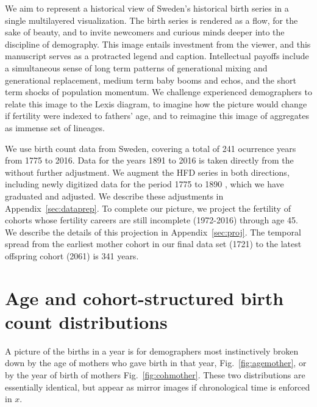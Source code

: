 \documentclass{article}
\begin{document}
We aim to represent a historical view of Sweden's historical birth series in a single multilayered visualization. The birth series is rendered as a flow, for the sake of beauty, and to invite newcomers and curious minds deeper into the discipline of demography. This image entails investment from the viewer, and this manuscript serves as a protracted legend and caption. Intellectual payoffs include a simultaneous sense of long term patterns of generational mixing and generational replacement, medium term baby booms and echos, and the short term shocks of population momentum. We challenge experienced demographers to relate this image to the Lexis diagram, to imagine how the picture would change if fertility were indexed to fathers' age, and to reimagine this image of aggregates as immense set of lineages.

We use birth count data from Sweden, covering a total of 241 ocurrence years from 1775 to 2016. Data for the years 1891 to 2016 is taken directly from the \citet{HFD} without further adjustment. We augment the HFD series in both directions, including newly digitized data for the period 1775 to 1890 \citep{sgf1907}, which we have graduated and adjusted. We describe these adjustments in Appendix~\ref{sec:dataprep}. To complete our picture, we project the fertility of cohorts whose fertility careers are still incomplete (1972-2016) through age 45. We describe the details of this projection in Appendix~\ref{sec:proj}. The temporal spread from the earliest mother cohort in our final data set (1721) to the latest offspring cohort (2061) is 341 years.

\section{Age and cohort-structured birth count distributions}
A picture of the births in a year is for demographers most instinctively broken down by the age of mothers who gave birth in that year, Fig.~\ref{fig:agemother}, or by the year of birth of mothers Fig.~\ref{fig:cohmother}. These two distributions are essentially identical, but appear as mirror images if chronological time is enforced in $x$.
\end{document}
